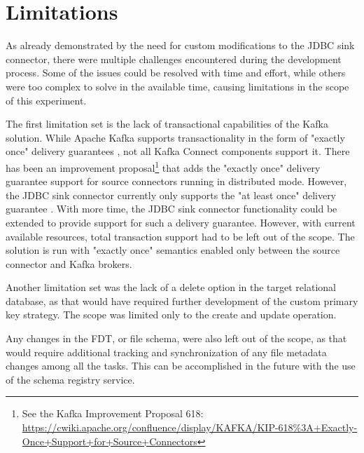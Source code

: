 
\section{Limitations}
\label{ch04:pipelinedevelopment:solutionlimitations}
As already demonstrated by the need for custom modifications to the \ac{JDBC} sink connector, there were multiple challenges encountered during the development process. Some of the issues could be resolved with time and effort, while others were too complex to solve in the available time, causing limitations in the scope of this experiment.

The first limitation set is the lack of transactional capabilities of the Kafka solution. While Apache Kafka supports transactionality in the form of "exactly once" delivery guarantees \cite{kafkadocumentation}, not all Kafka Connect components support it. There has been an improvement proposal\footnote{See the Kafka Improvement Proposal 618: \url{https://cwiki.apache.org/confluence/display/KAFKA/KIP-618\%3A+Exactly-Once+Support+for+Source+Connectors}} that adds the "exactly once" delivery guarantee support for source connectors running in distributed mode. However, the \ac{JDBC} sink connector currently only supports the "at least once" delivery guarantee \cite{jdbcsinkdocumentation}. With more time, the \ac{JDBC} sink connector functionality could be extended to provide support for such a delivery guarantee. However, with current available resources, total transaction support had to be left out of the scope. The solution is run with "exactly once" semantics enabled only between the source connector and Kafka brokers.

Another limitation set was the lack of a delete option in the target relational database, as that would have required further development of the custom primary key strategy. The scope was limited only to the create and update operation.

Any changes in the \ac{FDT}, or file schema, were also left out of the scope, as that would require additional tracking and synchronization of any file metadata changes among all the tasks. This can be accomplished in the future with the use of the schema registry service.

